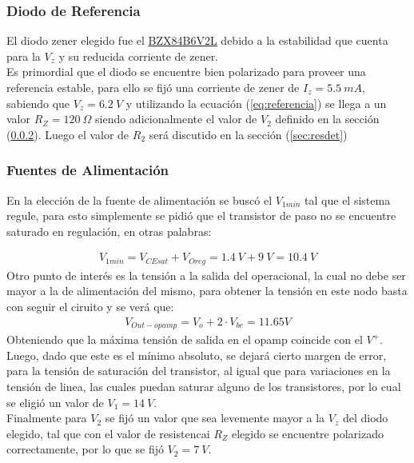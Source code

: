 \subsubsection{Diodo de Referencia}
El diodo zener elegido fue el \href{https://d1d2qsbl8m0m72.cloudfront.net/en/products/databook/datasheet/discrete/diode/zener/bzx84b6v2lt116-e.pdf}{BZX84B6V2L}
debido a la estabilidad que cuenta para la $V_z$ y su reducida corriente de zener.\\
Es primordial que el diodo se encuentre bien polarizado para proveer una referencia estable, para ello se fijó una corriente de zener de $I_z =5.5 \ mA$, sabiendo que $V_z=6.2 \ V$  y utilizando la ecuación (\ref{eq:referencia}) se llega a un valor $R_Z=120 \ \Omega$ siendo adicionalmente el valor de $V_2$ definido en la sección (\ref{sec:fuentes}).
Luego el valor de $R_2$ será discutido en la sección (\ref{sec:resdet})
\subsubsection{Fuentes de Alimentación}
\label{sec:fuentes}
En la elección de la fuente de alimentación se buscó el $V_{1min}$ tal que el sistema regule, para esto simplemente se pidió que el transistor de paso no se encuentre saturado en regulación, en otras palabras:

\begin{align}
V_{1min}=V_{CEsat}+V_{Oreg}= 1.4 \ V+9 \ V=10.4 \ V
\end{align}
Otro punto de interés es la tensión a la salida del operacional, la cual no debe ser mayor a la de alimentación del mismo, para obtener la tensión en este nodo basta con seguir el ciruito y se verá que:
\begin{align}
V_{Out-opamp}= V_o+2\cdot V_{be} = 11.65V
\end{align}
Obteniendo que la máxima tensión de salida en el opamp coincide con el $V^+$.\\
Luego, dado que este es el mínimo absoluto, se dejará cierto margen de error, para la tensión de saturación del transistor, al igual que para variaciones en la tensión de linea, las cuales puedan saturar alguno de los transistores, por lo cual se eligió un valor de $V_1=14 \ V$.\\
Finalmente para $V_2$ se fijó un valor que sea levemente mayor a la $V_z$ del diodo elegido, tal que con el valor de resistencai $R_Z$ elegido se encuentre polarizado correctamente, por lo que se fijó $V_2=7\ V$.



